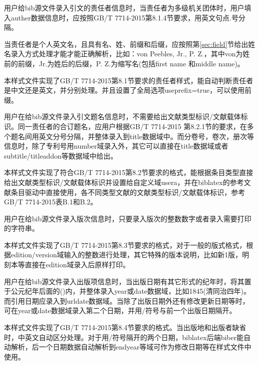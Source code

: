 \begin{property}{}{}
用户给bib源文件录入引文的责任者信息时，当责任者为多级机关团体时，用户填入auther数据信息时，应按照GB/T 7714-2015第8.1.4节要求，用英文句点.号分隔。

当责任者是个人英文名，且具有名、姓、前缀和后缀，应按照第\ref{sec:field}节给出姓名录入方式处理才能才能正确解析，比如：von Peebles, Jr., P. Z.，其中von为姓前的前缀，Jr.为姓后的后缀，P. Z.为缩写名(包括first name 和middle name)。

本样式文件实现了GB/T 7714-2015第8.1节要求的责任者样式，能自动判断责任者是中文还是英文，并分别处理。并且设置了全局选项useprefix=true，可以使用前缀。
\end{property}

\begin{property}{}{}
用户在给bib源文件录入引文题名信息时，不需要给出文献类型标识/文献载体标识。同一责任者的合订题名，应用户根据GB/T 7714-2015 第8.2.1节的要求，在多个题名间用英文分号分隔，并整体录入到title数据域中。而分卷号，卷次，册次等信息时，除了专利号用number域录入外，其它可以直接在title数据域或者subtitle/titleaddon等数据域中给出。

本样式文件实现了符合GB/T 7714-2015第8.2节要求的格式，能根据条目类型直接给出文献类型标识/文献载体标识并设置给自定义域usera，并在biblatex的参考文献条目驱动中直接使用，各不同类型文献的文献类型标识/文献载体标识，参考GB/T 7714-2015表B.1和B.2。
\end{property}

\begin{property}{}{}
用户在给bib源文件录入版次信息时，只要录入版次的整数数字或者录入需要打印的字符串。

本样式文件实现了GB/T 7714-2015第8.3节要求的格式，对于一般的版式格式，根据edition/version域输入的整数进行处理，其它特殊的版本说明，比如新1版，明刻本等直接在edition域录入后原样打印。
\end{property}

\begin{property}{}{}
用户在给bib源文件录入出版项信息时，当出版日期有其它形式的纪年时，将其置于公元纪年后面的()内，并整体录入year或date数据域，比如1845(清同治四年)。而引用日期应录入到urldate数据域。当除了出版日期外还有修改更新日期等时，可在year或date数据域录入第二个日期，并用/符号与前一个出版日期隔开。

本样式文件实现了GB/T 7714-2015第8.4节要求的格式。当出版地和出版者缺省时，中英文自动区分处理。对于用/符号隔开的两个日期，biblatex后端biber能自动解析，后一个日期数据自动解析到endyear等域可作为修改日期等在样式文件中使用。
\end{property}


